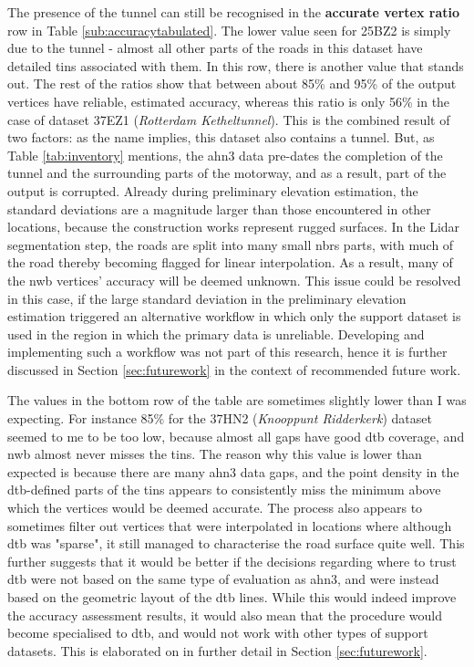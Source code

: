 The presence of the tunnel can still be recognised in the \textbf{accurate vertex ratio} row in Table \ref{sub:accuracytabulated}. The lower value seen for 25BZ2 is simply due to the tunnel - almost all other parts of the roads in this dataset have detailed \ac{tin}s associated with them. In this row, there is another value that stands out. The rest of the ratios show that between about 85\% and 95\% of the output vertices have reliable, estimated accuracy, whereas this ratio is only 56\% in the case of dataset 37EZ1 (\textit{Rotterdam Ketheltunnel}). This is the combined result of two factors: as the name implies, this dataset also contains a tunnel. But, as Table \ref{tab:inventory} mentions, the \ac{ahn3} data pre-dates the completion of the tunnel and the surrounding parts of the motorway, and as a result, part of the output is corrupted. Already during preliminary elevation estimation, the standard deviations are a magnitude larger than those encountered in other locations, because the construction works represent rugged surfaces. In the Lidar segmentation step, the roads are split into many small \ac{nbrs} parts, with much of the road thereby becoming flagged for linear interpolation. As a result, many of the \ac{nwb} vertices' accuracy will be deemed unknown. This issue could be resolved in this case, if the large standard deviation in the preliminary elevation estimation triggered an alternative workflow in which only the support dataset is used in the region in which the primary data is unreliable. Developing and implementing such a workflow was not part of this research, hence it is further discussed in Section \ref{sec:futurework} in the context of recommended future work.

The values in the bottom row of the table are sometimes slightly lower than I was expecting. For instance 85\% for the 37HN2 (\textit{Knooppunt Ridderkerk}) dataset seemed to me to be too low, because almost all gaps have good \ac{dtb} coverage, and \ac{nwb} almost never misses the \ac{tin}s. The reason why this value is lower than expected is because there are many \ac{ahn3} data gaps, and the point density in the \ac{dtb}-defined parts of the \ac{tin}s appears to consistently miss the minimum above which the vertices would be deemed accurate. The process also appears to sometimes filter out vertices that were interpolated in locations where although \ac{dtb} was "sparse", it still managed to characterise the road surface quite well. This further suggests that it would be better if the decisions regarding where to trust \ac{dtb} were not based on the same type of evaluation as \ac{ahn3}, and were instead based on the geometric layout of the \ac{dtb} lines. While this would indeed improve the accuracy assessment results, it would also mean that the procedure would become specialised to \ac{dtb}, and would not work with other types of support datasets. This is elaborated on in further detail in Section \ref{sec:futurework}.

